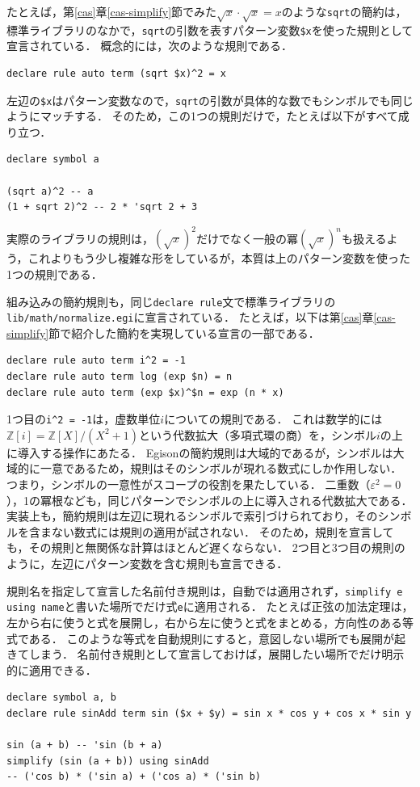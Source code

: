 たとえば，第\ref{cas}章\ref{cas-simplify}節でみた$\sqrt{x} \cdot \sqrt{x} = x$のような\lstinline{sqrt}の簡約は，標準ライブラリのなかで，\lstinline{sqrt}の引数を表すパターン変数\lstinline{$x}を使った規則として宣言されている．
概念的には，次のような規則である．
\begin{lstlisting}[language=egison,numbers=none]
declare rule auto term (sqrt $x)^2 = x
\end{lstlisting}
左辺の\lstinline{$x}はパターン変数なので，\lstinline{sqrt}の引数が具体的な数でもシンボルでも同じようにマッチする．
そのため，この1つの規則だけで，たとえば以下がすべて成り立つ．
\begin{lstlisting}[language=egison,numbers=none]
declare symbol a

(sqrt a)^2 -- a
(1 + sqrt 2)^2 -- 2 * 'sqrt 2 + 3
\end{lstlisting}
実際のライブラリの規則は，$(\sqrt{x})^2$だけでなく一般の冪$(\sqrt{x})^n$も扱えるよう，これよりもう少し複雑な形をしているが，本質は上のパターン変数を使った1つの規則である．

組み込みの簡約規則も，同じ\lstinline{declare rule}文で標準ライブラリの\texttt{lib/math/normalize.egi}に宣言されている．
たとえば，以下は第\ref{cas}章\ref{cas-simplify}節で紹介した簡約を実現している宣言の一部である．
\begin{lstlisting}[language=egison,numbers=none]
declare rule auto term i^2 = -1
declare rule auto term log (exp $n) = n
declare rule auto term (exp $x)^$n = exp (n * x)
\end{lstlisting}
1つ目の\lstinline{i^2 = -1}は，虚数単位$i$についての規則である．
これは数学的には$\mathbb{Z}[i] = \mathbb{Z}[X]/(X^2+1)$という代数拡大（多項式環の商）を，シンボル$i$の上に導入する操作にあたる．
Egisonの簡約規則は大域的であるが，シンボルは大域的に一意であるため，規則はそのシンボルが現れる数式にしか作用しない．
つまり，シンボルの一意性がスコープの役割を果たしている．
二重数（$\varepsilon^2 = 0$），1の冪根なども，同じパターンでシンボルの上に導入される代数拡大である．
実装上も，簡約規則は左辺に現れるシンボルで索引づけられており，そのシンボルを含まない数式には規則の適用が試されない．
そのため，規則を宣言しても，その規則と無関係な計算はほとんど遅くならない．
2つ目と3つ目の規則のように，左辺にパターン変数を含む規則も宣言できる．

規則名を指定して宣言した名前付き規則は，自動では適用されず，\lstinline{simplify e using name}と書いた場所でだけ式\lstinline{e}に適用される．
たとえば正弦の加法定理は，左から右に使うと式を展開し，右から左に使うと式をまとめる，方向性のある等式である．
このような等式を自動規則にすると，意図しない場所でも展開が起きてしまう．
名前付き規則として宣言しておけば，展開したい場所でだけ明示的に適用できる．
\begin{lstlisting}[language=egison,numbers=none]
declare symbol a, b
declare rule sinAdd term sin ($x + $y) = sin x * cos y + cos x * sin y

sin (a + b) -- 'sin (b + a)
simplify (sin (a + b)) using sinAdd
-- ('cos b) * ('sin a) + ('cos a) * ('sin b)
\end{lstlisting}

